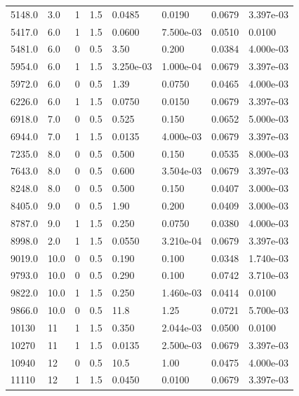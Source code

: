 \documentclass[preview]{standalone}
\begin{document}
{{\begin{tabular}{L{1.2cm}C{1.2cm} C{0.3cm}C{0.5cm} C{1.4cm}C{1.4cm} C{1.4cm}C{1.4cm}}
  5148.0  &   3.0  & 1     & 1.5 &  0.0485  & 0.0190  & 0.0679 &  3.397e-03   \\ 
  5417.0  &   6.0  & 1     & 1.5 &  0.0600  & 7.500e-03  & 0.0510 &  0.0100   \\ 
  5481.0  &   6.0  & 0     & 0.5 &  3.50  & 0.200  & 0.0384 &  4.000e-03   \\ 
  5954.0  &   6.0  & 1     & 1.5 &  3.250e-03  & 1.000e-04  & 0.0679 &  3.397e-03   \\ 
  5972.0  &   6.0  & 0     & 0.5 &  1.39  & 0.0750  & 0.0465 &  4.000e-03   \\ 
  6226.0  &   6.0  & 1     & 1.5 &  0.0750  & 0.0150  & 0.0679 &  3.397e-03   \\ 
  6918.0  &   7.0  & 0     & 0.5 &  0.525  & 0.150  & 0.0652 &  5.000e-03   \\ 
  6944.0  &   7.0  & 1     & 1.5 &  0.0135  & 4.000e-03  & 0.0679 &  3.397e-03   \\ 
  7235.0  &   8.0  & 0     & 0.5 &  0.500  & 0.150  & 0.0535 &  8.000e-03   \\ 
  7643.0  &   8.0  & 0     & 0.5 &  0.600  & 3.504e-03  & 0.0679 &  3.397e-03   \\ 
  8248.0  &   8.0  & 0     & 0.5 &  0.500  & 0.150  & 0.0407 &  3.000e-03   \\ 
  8405.0  &   9.0  & 0     & 0.5 &  1.90  & 0.200  & 0.0409 &  3.000e-03   \\ 
  8787.0  &   9.0  & 1     & 1.5 &  0.250  & 0.0750  & 0.0380 &  4.000e-03   \\ 
  8998.0  &   2.0  & 1     & 1.5 &  0.0550  & 3.210e-04  & 0.0679 &  3.397e-03   \\ 
  9019.0  &  10.0  & 0     & 0.5 &  0.190  & 0.100  & 0.0348 &  1.740e-03   \\ 
  9793.0  &  10.0  & 0     & 0.5 &  0.290  & 0.100  & 0.0742 &  3.710e-03   \\ 
  9822.0  &  10.0  & 1     & 1.5 &  0.250  & 1.460e-03  & 0.0414 &  0.0100   \\ 
  9866.0  &  10.0  & 0     & 0.5 &  11.8  & 1.25  & 0.0721 &  5.700e-03   \\ 
  10130  &    11  & 1     & 1.5 &  0.350  & 2.044e-03  & 0.0500 &  0.0100   \\ 
  10270  &    11  & 1     & 1.5 &  0.0135  & 2.500e-03  & 0.0679 &  3.397e-03   \\ 
  10940  &    12  & 0     & 0.5 &  10.5  & 1.00  & 0.0475 &  4.000e-03   \\ 
  11110  &    12  & 1     & 1.5 &  0.0450  & 0.0100  & 0.0679 &  3.397e-03   \\ 

\end{tabular}}}
\end{document}
